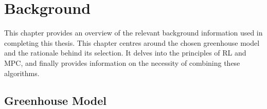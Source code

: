 \chapter{Background}
\label{chapter:Background}

This chapter provides an overview of the relevant background information used in completing this thesis. This chapter centres around the chosen greenhouse model and the rationale behind its selection. It delves into the principles of RL and MPC, and finally provides information on the necessity of combining these algorithms. 

\section{Greenhouse Model}
\label{section:greenhouse-model}

